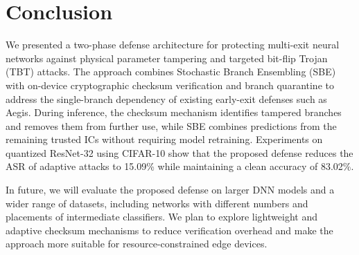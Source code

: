 \documentclass[conference,10pt]{IEEEtran}
\begin{document}
\section{Conclusion}


We presented a two-phase defense architecture for protecting multi-exit neural networks against physical parameter tampering and targeted bit-flip Trojan (TBT) attacks. The approach combines Stochastic Branch Ensembling (SBE) with on-device cryptographic checksum verification and branch quarantine to address the single-branch dependency of existing early-exit defenses such as Aegis. During inference, the checksum mechanism identifies tampered branches and removes them from further use, while SBE combines predictions from the remaining trusted ICs without requiring model retraining. Experiments on quantized ResNet-32 using CIFAR-10 show that the proposed defense reduces the ASR of adaptive attacks to 15.09\% while maintaining a clean accuracy of 83.02\%. 

 In future,  we will evaluate the proposed defense on larger DNN models and a wider range of datasets, including networks with different numbers and placements of intermediate classifiers. We plan to explore lightweight and adaptive checksum mechanisms to reduce verification overhead and make the approach more suitable for resource-constrained edge devices.




\newpage
{}
\end{document}
